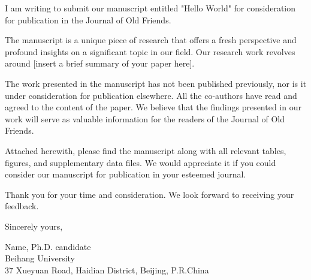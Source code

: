 \documentclass{article}
\begin{document}
I am writing to submit our manuscript entitled "Hello World" for consideration for publication in the Journal of Old Friends.

The manuscript is a unique piece of research that offers a fresh perspective and profound insights on a significant topic in our field. Our research work revolves around [insert a brief summary of your paper here].

The work presented in the manuscript has not been published previously, nor is it under consideration for publication elsewhere. All the co-authors have read and agreed to the content of the paper. We believe that the findings presented in our work will serve as valuable information for the readers of the Journal of Old Friends.

Attached herewith, please find the manuscript along with all relevant tables, figures, and supplementary data files. We would appreciate it if you could consider our manuscript for publication in your esteemed journal.

Thank you for your time and consideration. We look forward to receiving your feedback.

\bigskip %

Sincerely yours,

\vspace{20pt} %


Name, Ph.D. candidate \\
Beihang University \\
37 Xueyuan Road, Haidian District, Beijing, P.R.China
\end{document}
